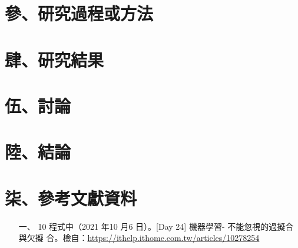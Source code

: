 \section{參、研究過程或方法}

\section{肆、研究結果}

\section{伍、討論}

\section{陸、結論}

\section{柒、參考文獻資料}
\begin{itemize}
    \item [一、] 10 程式中（2021 年10 月6 日）。[Day 24] 機器學習- 不能忽視的過擬合與欠擬
    合。檢自：\url{https://ithelp.ithome.com.tw/articles/10278254}
\end{itemize}